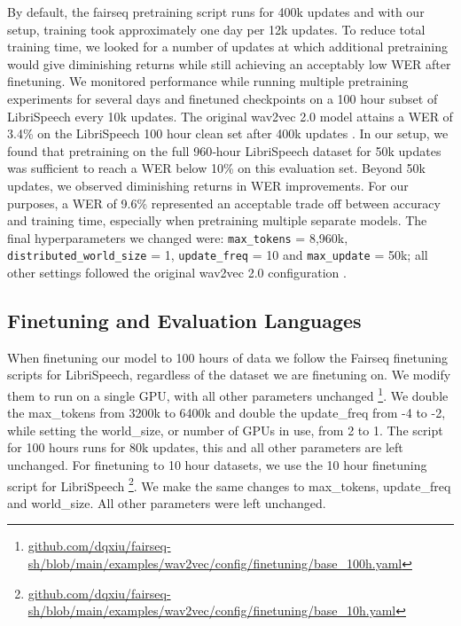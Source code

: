 By default, the fairseq pretraining script runs for 400k updates and with our setup, training took approximately one day per 12k updates. To reduce total training time, we looked for a number of updates at which additional pretraining would give diminishing returns while still achieving an acceptably low WER after finetuning. We monitored performance while running multiple pretraining experiments for several days and finetuned checkpoints on a 100 hour subset of LibriSpeech every 10k updates. The original wav2vec 2.0 model attains a WER of 3.4\% on the LibriSpeech 100 hour clean set after 400k updates \cite{wav2vec}. In our setup, we found that pretraining on the full 960‑hour LibriSpeech dataset for 50k updates was sufficient to reach a WER below 10\% on this evaluation set. Beyond 50k updates, we observed diminishing returns in WER improvements. For our purposes, a WER of 9.6\% represented an acceptable trade off between accuracy and training time, especially when pretraining multiple separate models. The final hyperparameters we changed were: \texttt{max\_tokens} = 8,960k, \texttt{distributed\_world\_size} = 1, \texttt{update\_freq} = 10 and \texttt{max\_update} = 50k; all other settings followed the original wav2vec 2.0 configuration \cite{wav2vec}.


\subsection{Finetuning and Evaluation Languages}\label{ed_subsec:finetuning}
When finetuning our model to 100 hours of data  we follow the Fairseq finetuning scripts for LibriSpeech, regardless of the dataset we are finetuning on. We modify them to run on a single GPU, with all other parameters unchanged \footnote{\href{https://github.com/dqxiu/fairseq-sh/blob/main/examples/wav2vec/config/finetuning/base_100h.yaml}{github.com/dqxiu/fairseq-sh/blob/main/examples/wav2vec/config/finetuning/base\_100h.yaml}}. We double the max\_tokens from 3200k to 6400k and double the update\_freq from -4 to -2, while setting the world\_size, or number of GPUs in use, from 2 to 1. The script for 100 hours runs for 80k updates, this and all other parameters are left unchanged. For finetuning to 10 hour datasets, we use the 10 hour finetuning script for LibriSpeech \footnote{\href{https://github.com/dqxiu/fairseq-sh/blob/main/examples/wav2vec/config/finetuning/base_10h.yaml}{github.com/dqxiu/fairseq-sh/blob/main/examples/wav2vec/config/finetuning/base\_10h.yaml}}. We make the same changes to max\_tokens, update\_freq and world\_size. All other parameters were left unchanged.

